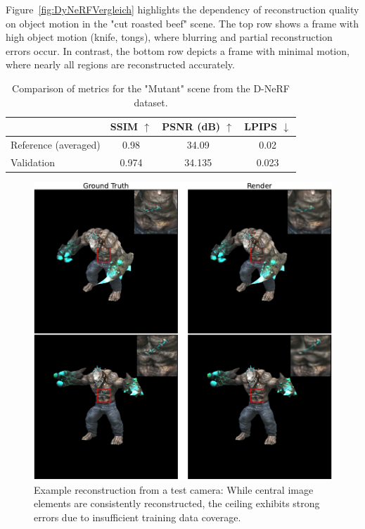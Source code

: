 Figure~\ref{fig:DyNeRFVergleich} highlights the dependency of reconstruction quality on object motion in the "cut roasted beef" scene. 
The top row shows a frame with high object motion (knife, tongs), where blurring and partial reconstruction errors occur. 
In contrast, the bottom row depicts a frame with minimal motion, where nearly all regions are reconstructed accurately. 

\begin{table}[h]
    \centering
    \caption{Comparison of metrics for the "Mutant" scene from the D-NeRF dataset.}
    \label{tab:mutant_metrics}
    \begin{tabular}{lccc}
        \toprule
        & SSIM $\uparrow$ & PSNR (dB) $\uparrow$ & LPIPS $\downarrow$\\
        \midrule
        Reference (averaged) \cite{yang2023gs4d} & 0.98 & 34.09 & 0.02 \\
        Validation  & 0.974 & 34.135 & 0.023\\
        \bottomrule
    \end{tabular}
\end{table}

\begin{figure}[h]
    \centering
    \includegraphics[width=\linewidth]{bilder/Results/Wang/DNerf/Vergleich_DNeRF.pdf}
    \caption{Example reconstruction from a test camera: While central image elements are consistently reconstructed, the ceiling exhibits strong errors due to insufficient training data coverage.}
    \label{fig:DNeRFVergleich}
\end{figure}

